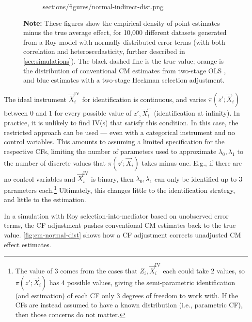 \begin{figure}[!h]
\begin{subfigure}[c]{0.475\textwidth}
{            sections/figures/normal-indirect-dist.png}
    \end{subfigure}
    \label{fig:cm-normal-dist}
    \justify
    \footnotesize
    \textbf{Note:}
    These figures show the empirical density of point estimates minus the true average effect, for 10,000 different datasets generated from a Roy model with normally distributed error terms (with both correlation and heteroscedasticity, further described in \autoref{sec:simulations}).
    The black dashed line is the true value;
    orange is the distribution of conventional CM estimates from two-stage OLS \citep{imai2010identification},
    and blue estimates with a two-stage Heckman selection adjustment.
\end{figure}

The ideal instrument $\vec X_i^{\text{IV}}$ for identification is continuous, and varies $\pi(z'; \vec X_i)$ between 0 and 1 for every possible value of $z', \vec X_i^-$ (identification at infinity).
In practice, it is unlikely to find IV(s) that satisfy this condition.
In this case, the \cite{brinch2017beyond} restricted approach can be used --- even with a categorical instrument and no control variables.
This amounts to assuming a limited specification for the respective CFs, limiting the number of parameters used to approximate $\lambda_0, \lambda_1$ to the number of discrete values that $\pi(z'; \vec X_i)$ takes minus one.
E.g., if there are no control variables and $\vec X_i^{\text{IV}}$ is binary, then $\lambda_0, \lambda_1$ can only be identified up to 3 parameters each.\footnote{
    The value of 3 comes from the cases that $Z_i, \vec X_i^{\text{IV}}$ each could take 2 values, so $\pi(z'; \vec X_i)$ has 4 possible values, giving the semi-parametric identification (and estimation) of each CF only 3 degrees of freedom to work with.
    If the CFs are instead assumed to have a known distribution (i.e., parametric CF), then those concerns do not matter.
}
Ultimately, this changes little to the identification strategy, and little to the estimation.

In a simulation with Roy selection-into-mediator based on unobserved error terms, the CF adjustment pushes conventional CM estimates back to the true value. 
\autoref{fig:cm-normal-dist} shows how a CF adjustment corrects unadjusted CM effect estimates.
